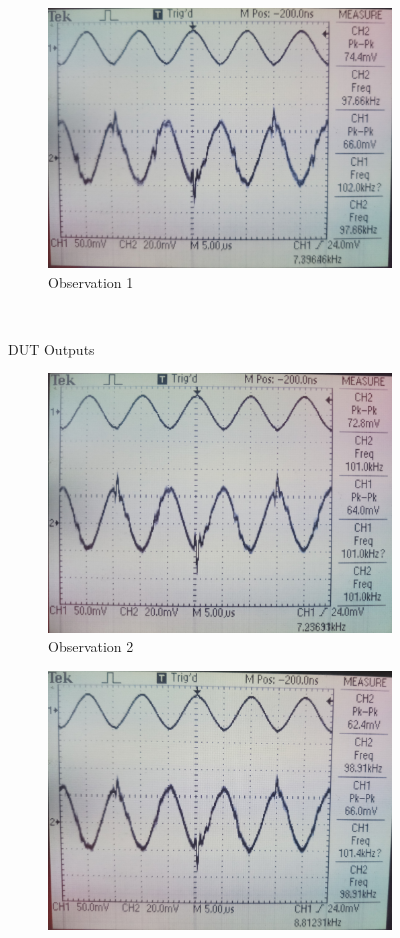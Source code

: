 \documentclass[12pt]{article}
\begin{document}
\begin{center}
\begin{figure}[H]
	\begin{subfigure}[b]{\linewidth}
	   	\includegraphics[width = 0.75\linewidth, trim = {0 0 0 0}, clip]{15_22_19.jpg}
		\caption{Observation 1}
	\end{subfigure}\\
	\caption{DUT Outputs}
\end{figure}
\begin{figure}[H]
	\begin{subfigure}[b]{\linewidth}
	   	\includegraphics[width = 0.85\linewidth, trim = {0 0 0 0}, clip]{15_23_06.jpg}
		\caption{Observation 2}
	\end{subfigure}
	\begin{subfigure}[b]{\linewidth}
	   	\includegraphics[width = 0.85\linewidth, trim = {0 0 0 0}, clip]{15_24_11.jpg}

\end{subfigure}
\end{figure}
\end{center}
\end{document}

